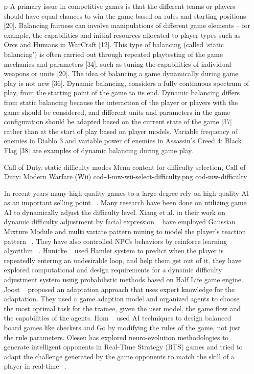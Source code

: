 p A primary issue in competitive games is that the different teams or players should have equal chances to win the game based on rules and starting positions [20]. Balancing fairness can involve manipulations of different game elements – for example, the capabilities and initial resources allocated to player types such as Orcs and Humans in WarCraft [12]. This type of balancing (called `static balancing') is often carried out through repeated playtesting of the game mechanics and parameters [34], such as tuning the capabilities of individual weapons or units [20].  The idea of balancing a game dynamically during game play is not new [36]. Dynamic balancing, considers a fully continuous spectrum of play, from the starting point of the game to its end. Dynamic balancing differs from static balancing because the interaction of the player or players with the game should be considered, and different units and parameters in the game configuration should be adapted based on the current state of the game [37] rather than at the start of play based on player models. Variable frequency of enemies in Diablo 3 and variable power of enemies in Assassin's Creed 4: Black Flag [38] are examples of dynamic balancing during game play. 

\img
{Call of Duty, static difficulty modes}
{Menu content for difficulty selection, Call of Duty: Modern Warfare (Wii)}
{cod-4-mw-wii-select-difficulty.png}
{cod-mw-difficulty}

In recent years many high quality games to a large degree rely on high quality AI as an important selling point ~\cite{forbus2002ai}. Many research have been done on utilizing game AI to dynamically adjust the difficulty level. Xiang et al. in their work on dynamic difficulty adjustment by facial expression ~\cite{xiang2013dynamic} have employed Gaussian Mixture Module and multi variate pattern mining to model the player's reaction pattern ~\cite{lee2006dynamic, chiu2008using}. They have also controlled NPCs behaviors by reinforce learning algorithm ~\cite{spronck2004difficulty, andrade2005challenge}. Hunicke ~\cite{hunicke2004ai} used Hamlet system to predict when the player is repeatedly entering an undesirable loop, and help them get out of it, they have explored computational and design requirements for a dynamic difficulty adjustment system using probabilistic methods based on Half Life game engine. Joost ~\cite{westra2009adaptive} proposed an adaptation approach that uses expert knowledge for the adaptation. They used a game adaption model and organized agents to choose the most optimal task for the trainee, given the user model, the game flow and the capabilities of the agents. Hom ~\cite{hom2007automatic} used AI techniques to design balanced board games like checkers and Go by modifying the rules of the game, not just the rule parameters. Olesen has explored neuro-evolution methodologies to generate intelligent opponents in Real-Time Strategy (RTS) games and tried to adapt the challenge generated by the game opponents to match the skill of a player in real-time ~\cite{olesen2008real}.

